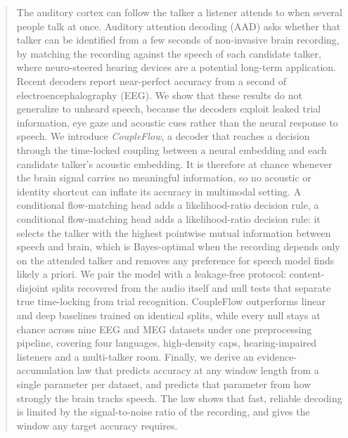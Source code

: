 \documentclass[twoside]{article}
\begin{document}
\begin{abstract}
The auditory cortex can follow the talker a listener attends to when several people talk at once. Auditory attention decoding (AAD) asks whether that talker can be identified from a few seconds of non-invasive brain recording, by matching the recording against the speech of each candidate talker, where neuro-steered hearing devices are a potential long-term application. Recent decoders report near-perfect accuracy from a second of electroencephalography (EEG). We show that these results do not generalize to unheard speech, because the decoders exploit leaked trial information, eye gaze and acoustic cues rather than the neural response to speech. We introduce \emph{CoupleFlow}, a decoder that reaches a decision through the
time-locked coupling between a neural embedding and each candidate talker's acoustic embedding. It is therefore at chance whenever the brain signal carries no
meaningful information, so no acoustic or identity shortcut can inflate its accuracy in multimodal setting. A conditional
flow-matching head adds a likelihood-ratio decision rule,  a conditional flow-matching head adds a likelihood-ratio decision rule: it selects the talker with the highest pointwise mutual information between speech and brain, which is Bayes-optimal when the recording depends only on the
attended talker and removes any preference for speech model finds likely a priori. We pair the model
with a leakage-free protocol: content-disjoint splits recovered from the audio itself and
null tests that separate true time-locking from trial recognition. 
CoupleFlow outperforms linear and deep baselines trained on identical splits, while every null stays at chance across nine EEG and MEG datasets under one preprocessing pipeline, covering four languages, high-density caps, hearing-impaired listeners and a multi-talker room.
Finally, we derive
an evidence-accumulation law that predicts accuracy at any window length from a single
parameter per dataset, and predicts that parameter from how strongly the brain tracks
speech. The law shows that fast, reliable decoding is limited by the signal-to-noise ratio
of the recording, and gives the window any target accuracy requires.
\end{abstract}
\end{document}
